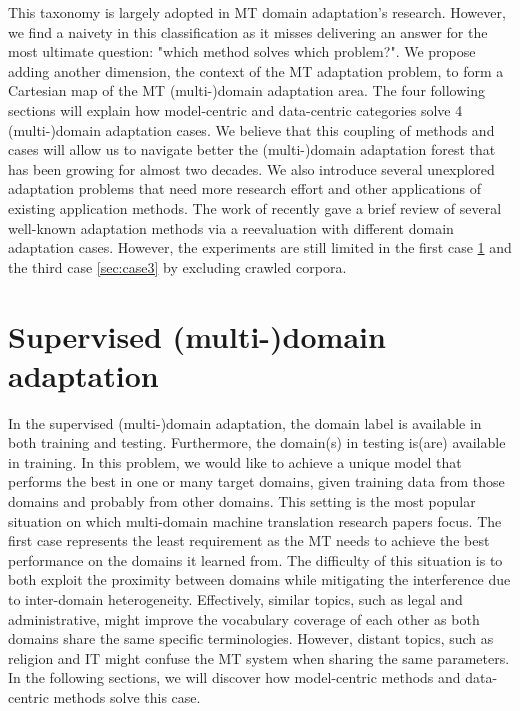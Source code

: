 This taxonomy is largely adopted in MT domain adaptation's research. However, we find a naivety in this classification as it misses delivering an answer for the most ultimate question: "which method solves which problem?". We propose adding another dimension, the context of the MT adaptation problem, to form a Cartesian map of the MT (multi-)domain adaptation area. The four following sections will explain how model-centric and data-centric categories solve 4 (multi-)domain adaptation cases. We believe that this coupling of methods and cases will allow us to navigate better the (multi-)domain adaptation forest that has been growing for almost two decades. We also introduce several unexplored adaptation problems that need more research effort and other applications of existing application methods. The work of \citet{Pham21revisiting} recently gave a brief review of several well-known adaptation methods via a reevaluation with different domain adaptation cases. However, the experiments are still limited in the first case \ref{sec:case1} and the third case \ref{sec:case3} by excluding crawled corpora.

\section{Supervised (multi-)domain adaptation}
\label{sec:case1}
In the supervised (multi-)domain adaptation, the domain label is available in both training and testing. Furthermore, the domain(s) in testing is(are) available in training. In this problem, we would like to achieve a unique model that performs the best in one or many target domains, given training data from those domains and probably from other domains. This setting is the most popular situation on which multi-domain machine translation research papers focus. The first case represents the least requirement as the MT needs to achieve the best performance on the domains it learned from. The difficulty of this situation is to both exploit the proximity between domains while mitigating the interference due to inter-domain heterogeneity. Effectively, similar topics, such as legal and administrative, might improve the vocabulary coverage of each other as both domains share the same specific terminologies. However, distant topics, such as religion and IT might confuse the MT system when sharing the same parameters. In the following sections, we will discover how model-centric methods and data-centric methods solve this case.
